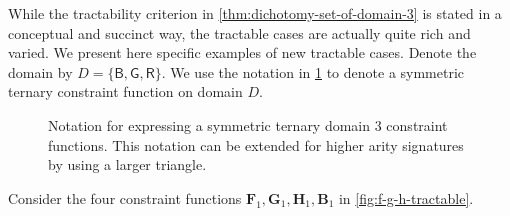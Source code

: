 \documentclass[11pt]{article}
\newcommand{\db}{\mathsf{B}}
\newcommand{\dg}{\mathsf{G}}
\newcommand{\dr}{\mathsf{R}}
\begin{document}
While the tractability criterion in
 \cref{thm:dichotomy-set-of-domain-3} is stated in a conceptual and succinct way,
 the tractable cases are actually quite rich and varied. We present here specific examples of new tractable cases.
Denote the domain by  $D = \{\db, \dg, \dr\}$.
We use the notation in \cref{fig:ternary-signature-notation} to denote a symmetric ternary constraint function on domain $D$.
\begin{figure}
\centering
\caption{Notation for expressing a symmetric ternary domain $3$ constraint functions. 
This notation can be extended for higher arity signatures by using a larger triangle.
}
\label{fig:ternary-signature-notation}
\end{figure}
Consider the four constraint functions $\mathbf{F}_1, \mathbf{G}_1, \mathbf{H}_1, \mathbf{B}_1$ in \cref{fig:f-g-h-tractable}.
\end{document}
